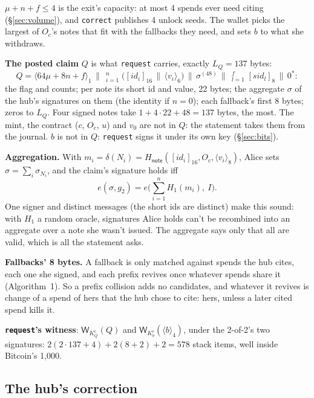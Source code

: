 \documentclass[11pt]{article}
\theoremstyle{plain}
\theoremstyle{definition}
\newcommand{\tx}[1]{\texttt{#1}}
\newcommand{\be}[2]{\langle #1\rangle_{#2}}
\newcommand{\pre}[2]{[#1]_{#2}}
\newcommand{\Ht}[1]{H_{\textsf{#1}}}
\newcommand{\Wots}{\mathsf{W}}
\newcommand{\sid}{\mathit{sid}}
\newcommand{\Oc}{O_c}
\newcommand{\KQ}{K_{Q}^{c}}
\newcommand{\Kb}{K_{b}^{c}}
\newcommand{\Hg}{H_{1}}
\begin{document}
$\mu + n + f \le 4$ is the exit's capacity: at most 4 spends ever need
citing (\S\ref{sec:volume}), and \tx{correct} publishes 4 unlock seeds.
The wallet picks the largest of $\Oc$'s notes that fit with the
fallbacks they need, and sets $b$ to what she withdraws.

\textbf{The posted claim} $Q$ is what \tx{request} carries, exactly
$L_Q = 137$ bytes:
\[
  Q = \be{64\mu + 8n + f}{1} \,\big\|\, \mathop{\big\|}_{i=1}^{n}
  \big(\pre{\mathit{id}_i}{16} \,\|\, \be{v_i}{6}\big)
  \,\big\|\, \sigma^{(48)} \,\big\|\, \mathop{\big\|}_{l=1}^{f} \pre{\sid_l}{8}
  \,\big\|\, 0^{\ast}:
\]
the flag and counts; per note its short id and value, 22 bytes; the
aggregate $\sigma$ of the hub's signatures on them (the identity if $n
= 0$); each fallback's first 8 bytes; zeros to $L_Q$. Four signed notes
take $1 + 4 \cdot 22 + 48 = 137$ bytes, the most. The mint, the
contract ($c$, $\Oc$, $u$) and $v_0$ are not in $Q$: the statement
takes them from the journal. $b$ is not in $Q$: \tx{request} signs it
under its own key (\S\ref{sec:bits}).

\textbf{Aggregation.} With $m_i = \delta(N_i) =
\Ht{note}(\pre{\mathit{id}_i}{16}, \Oc, \be{v_i}{8})$, Alice sets $\sigma
= \sum_i \sigma_{N_i}$, and the claim's signature holds iff
\[
  e(\sigma, g_2) = e\Big(\sum_{i=1}^{n} \Hg(m_i),\ I\Big).
\]
One signer and distinct messages (the short ids are distinct) make this
sound: with $\Hg$ a random oracle, signatures Alice holds can't be
recombined into an aggregate over a note she wasn't issued. The
aggregate says only that all are valid, which is all the statement
asks.

\textbf{Fallbacks' 8 bytes.} A fallback is only matched against spends
the hub cites, each one she signed, and each prefix revives once
whatever spends share it (Algorithm~1). So a prefix collision adds no
candidates, and whatever it revives is change of a spend of hers that
the hub chose to cite: hers, unless a later cited spend kills it.

\textbf{\tx{request}'s witness}: $\Wots_{\KQ}(Q)$ and
$\Wots_{\Kb}(\be{b}{4})$, under the 2-of-2's two signatures: $2(2 \cdot
137 + 4) + 2(8 + 2) + 2 = 578$ stack items, well inside Bitcoin's
1,000.

\subsection{The hub's correction}\label{sec:correct}
\end{document}
